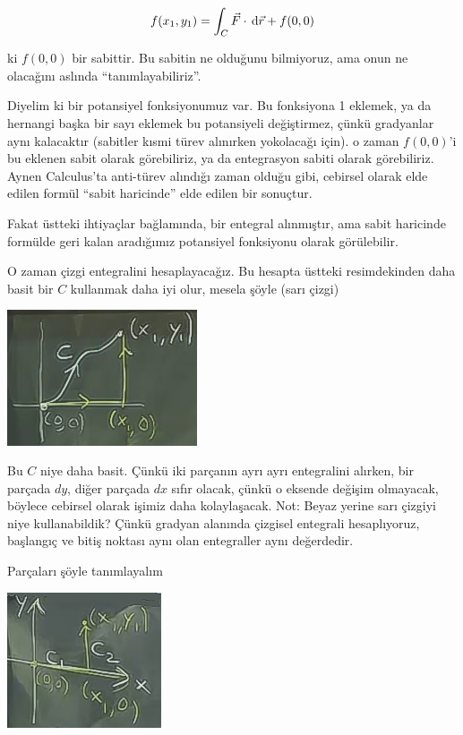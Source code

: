 \documentclass[12pt,fleqn]{article}\usepackage{../../common}
\begin{document}
$$ f(x_1,y_1) = \int_C \vec{F} \cdot \,\mathrm{d}\vec{r} + f(0,0) $$

ki $f(0,0)$ bir sabittir. Bu sabitin ne olduğunu bilmiyoruz, ama onun ne
olacağını aslında ``tanımlayabiliriz''. 

Diyelim ki bir potansiyel fonksiyonumuz var. Bu fonksiyona 1 eklemek, ya da
hernangi başka bir sayı eklemek bu potansiyeli değiştirmez, çünkü gradyanlar
aynı kalacaktır (sabitler kısmi türev alınırken yokolacağı için). o zaman
$f(0,0)$'i bu eklenen sabit olarak görebiliriz, ya da entegrasyon sabiti olarak
görebiliriz. Aynen Calculus'ta anti-türev alındığı zaman olduğu gibi, cebirsel
olarak elde edilen formül ``sabit haricinde'' elde edilen bir sonuçtur.

Fakat üstteki ihtiyaçlar bağlamında, bir entegral alınmıştır, ama sabit
haricinde formülde geri kalan aradığımız potansiyel fonksiyonu olarak
görülebilir.

O zaman çizgi entegralini hesaplayacağız. Bu hesapta üstteki resimdekinden daha
basit bir $C$ kullanmak daha iyi olur, mesela şöyle (sarı çizgi)

\begin{center}
\includegraphics[height=4cm]{21_3.png}
\end{center}

Bu $C$ niye daha basit. Çünkü iki parçanın ayrı ayrı entegralini alırken, bir
parçada $dy$, diğer parçada $dx$ sıfır olacak, çünkü o eksende değişim
olmayacak, böylece cebirsel olarak işimiz daha kolaylaşacak. Not: Beyaz yerine
sarı çizgiyi niye kullanabildik? Çünkü gradyan alanında çizgisel entegrali
hesaplıyoruz, başlangıç ve bitiş noktası aynı olan entegraller aynı değerdedir.

Parçaları şöyle tanımlayalım

\begin{center}
\includegraphics[height=4cm]{21_4.png}
\end{center}
\end{document}
